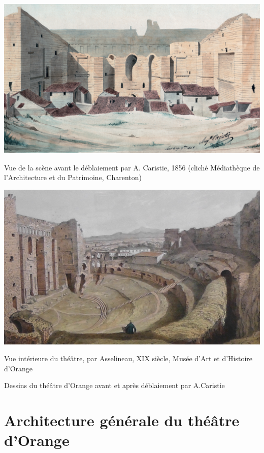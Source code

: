 		
\begin{figureth}
	\begin{subfigureth}{0.49\textwidth}
		\includegraphics[width=\linewidth]{images/av_deblaiement}
		\caption{Vue de la scène avant le déblaiement par A. Caristie, 1856 (cliché Médiathèque de l’Architecture et du Patrimoine, Charenton)}
	\end{subfigureth}
	\begin{subfigureth}{0.47\textwidth}
		\includegraphics[width=\linewidth]{images/asselineau}
		\caption{Vue intérieure du théâtre, par Asselineau, XIX siècle, Musée d'Art et d'Histoire d'Orange}
	\end{subfigureth}
	\caption[Théâtre d'Orange avant restauration]{Dessins du théâtre d'Orange avant et après déblaiement par A.Caristie}		
\end{figureth}		

		
	\chapter{Architecture générale du théâtre d'Orange}
		\minitoc
		\newpage
		
